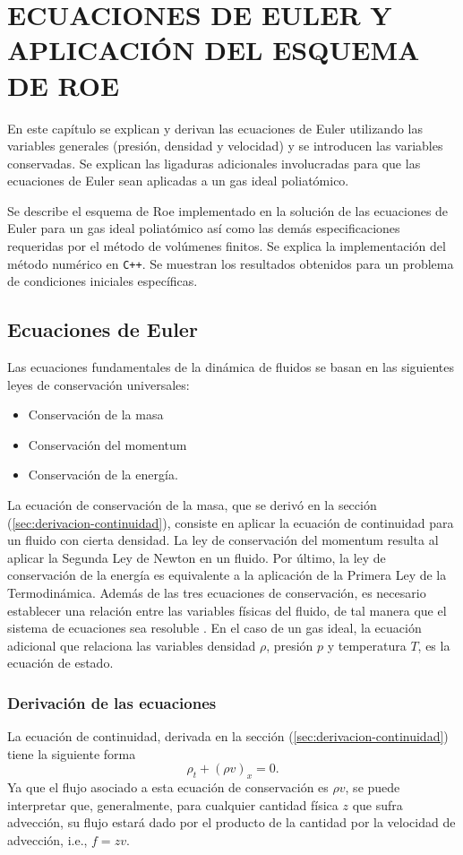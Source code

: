 \chapter{ECUACIONES DE EULER Y APLICACIÓN DEL ESQUEMA DE ROE}

En este capítulo se explican y derivan las ecuaciones de Euler utilizando las variables generales (presión, densidad y velocidad) y se introducen las variables conservadas. Se explican las ligaduras adicionales involucradas para que las ecuaciones de Euler sean aplicadas a un gas ideal poliatómico.

Se describe el esquema de Roe implementado en la solución de las ecuaciones de Euler para un gas ideal poliatómico así como las demás especificaciones requeridas por el método de volúmenes finitos. Se explica la implementación del método numérico en \texttt{C++}. Se muestran los resultados obtenidos para un problema de condiciones iniciales específicas.
\section{Ecuaciones de Euler}
Las ecuaciones fundamentales de la dinámica de fluidos se basan en las siguientes leyes de conservación universales:
\begin{itemize}
	\item Conservación de la masa
	\item Conservación del momentum
	\item Conservación de la energía.
\end{itemize}
La ecuación de conservación de la masa, que se derivó en la sección (\ref{sec:derivacion-continuidad}), consiste en aplicar la ecuación de continuidad para un fluido con cierta densidad. La ley de conservación del momentum resulta al aplicar la Segunda Ley de Newton en un fluido. Por último, la ley de conservación de la energía es equivalente a la aplicación de la Primera Ley de la Termodinámica. Además de las tres ecuaciones de conservación, es necesario establecer una relación entre las variables físicas del fluido, de tal manera que el sistema de ecuaciones sea resoluble \cite{heattransfer}. En el caso de un gas ideal, la ecuación adicional que relaciona las variables densidad $\rho$, presión $p$ y temperatura $T$, es la ecuación de estado. 
\subsection{Derivación de las ecuaciones}
La ecuación de continuidad, derivada en la sección (\ref{sec:derivacion-continuidad}) tiene la siguiente forma
\begin{equation}
	\rho_{t} + (\rho v)_{x} = 0.
	\label{eq:continuidad-euler}
\end{equation}
Ya que el flujo asociado a esta ecuación de conservación es $\rho v$, se puede interpretar que, generalmente, para cualquier cantidad física $z$ que sufra advección, su flujo estará dado por el producto de la cantidad por la velocidad de advección, i.e., $f=zv$. 

